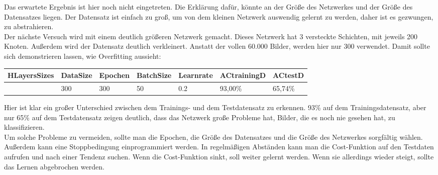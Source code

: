 \documentclass[12pt]{article}
\begin{document}
Das erwartete Ergebnis ist hier noch nicht eingetreten. Die Erklärung dafür, könnte an der Größe des Netzwerkes und der Größe des Datensatzes liegen. Der Datensatz ist einfach zu groß, um von dem kleinen Netzwerk auswendig gelernt zu werden, daher ist es gezwungen, zu abstrahieren.\\
Der nächste Versuch wird mit einem deutlich größeren Netzwerk gemacht. Dieses Netzwerk hat 3 versteckte Schichten, mit jeweils 200 Knoten. Außerdem wird der Datensatz deutlich verkleinert. Anstatt der vollen 60.000 Bilder, werden hier nur 300 verwendet. Damit sollte sich demonstrieren lassen, wie Overfitting aussieht:

\begin{table}[H]
    \centering
    \begin{tabular}{|p{}|l|l|l|l|l|l|}
    \hline
        HLayersSizes & DataSize & Epochen & BatchSize & Learnrate & ACtrainingD & ACtestD \\ \hline
        [784, 200, 200, 200, 10] & 300 & 300 & 50 & 0.2 & 93,00\% & 65,74\% \\ \hline
    \end{tabular}
\end{table}

Hier ist klar ein großer Unterschied zwischen dem Trainings- und dem Testdatensatz zu erkennen. 93\% auf dem Trainingsdatensatz, aber nur 65\% auf dem Testdatensatz zeigen deutlich, dass das Netzwerk große Probleme hat, Bilder, die es noch nie gesehen hat, zu klassifizieren.\\
Um solche Probleme zu vermeiden, sollte man die Epochen, die Größe des Datensatzes und die Größe des Netzwerkes sorgfältig wählen. Außerdem kann eine Stoppbedingung einprogrammiert werden. In regelmäßigen Abständen kann man die Cost-Funktion auf den Testdaten aufrufen und nach einer Tendenz suchen. Wenn die Cost-Funktion sinkt, soll weiter gelernt werden. Wenn sie allerdings wieder steigt, sollte das Lernen abgebrochen werden.

\cleardoublepage
\end{document}
